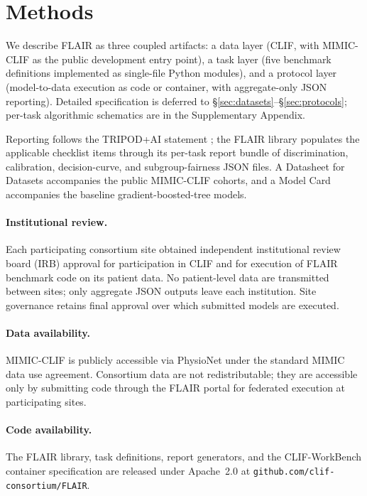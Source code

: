 \section{Methods}
\label{sec:methods}

We describe FLAIR as three coupled artifacts: a data layer (CLIF, with
MIMIC-CLIF as the public development entry point), a task layer (five
benchmark definitions implemented as single-file Python modules), and
a protocol layer (model-to-data execution as code or container, with
aggregate-only JSON reporting). Detailed specification is deferred to
\S\ref{sec:datasets}--\S\ref{sec:protocols}; per-task algorithmic
schematics are in the Supplementary Appendix.

Reporting follows the TRIPOD+AI statement
\citep{collins2024tripodai}; the FLAIR library populates the
applicable checklist items through its per-task report bundle of
discrimination, calibration, decision-curve, and subgroup-fairness
JSON files.
A Datasheet for Datasets \citep{gebru2021datasheets} accompanies the
public MIMIC-CLIF cohorts, and a Model Card \citep{mitchell2019modelcards}
accompanies the baseline gradient-boosted-tree models.

\paragraph{Institutional review.} Each participating consortium site
obtained independent institutional review board (IRB) approval for
participation in CLIF and for execution of FLAIR benchmark code on its
patient data. No patient-level data are transmitted between sites; only
aggregate JSON outputs leave each institution. Site governance retains
final approval over which submitted models are executed.

\paragraph{Data availability.} MIMIC-CLIF is publicly accessible via
PhysioNet under the standard MIMIC data use agreement. Consortium data
are not redistributable; they are accessible only by submitting code
through the FLAIR portal for federated execution at participating sites.

\paragraph{Code availability.} The FLAIR library, task definitions,
report generators, and the CLIF-WorkBench container specification are
released under Apache~2.0 at \texttt{github.com/clif-consortium/FLAIR}.
